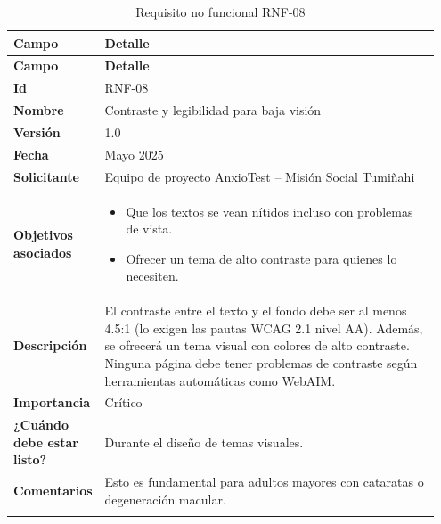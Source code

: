 \begin{longtable}{p{0.15\linewidth} p{0.80\linewidth}}
\toprule
\rowcolor{tableheader!20}
\textbf{Campo} & \textbf{Detalle} \\
\midrule
\endfirsthead
\rowcolor{tableheader!20}
\textbf{Campo} & \textbf{Detalle} \\
\midrule
\endhead
\bottomrule
\endfoot
\textbf{Id} & RNF-08 \\
\textbf{Nombre} & Contraste y legibilidad para baja visión \\
\textbf{Versión} & 1.0 \\
\textbf{Fecha} & Mayo 2025 \\
\textbf{Solicitante} & Equipo de proyecto AnxioTest – Misión Social Tumiñahi \\
\textbf{Objetivos asociados} & 
  \begin{itemize}
    \item Que los textos se vean nítidos incluso con problemas de vista.
    \item Ofrecer un tema de alto contraste para quienes lo necesiten.
  \end{itemize} \\
\textbf{Descripción} & El contraste entre el texto y el fondo debe ser al menos 4.5:1 (lo exigen las pautas WCAG 2.1 nivel AA). Además, se ofrecerá un tema visual con colores de alto contraste. Ninguna página debe tener problemas de contraste según herramientas automáticas como WebAIM. \\
\textbf{Importancia} & Crítico \\
\textbf{¿Cuándo debe estar listo?} & Durante el diseño de temas visuales. \\
\textbf{Comentarios} & Esto es fundamental para adultos mayores con cataratas o degeneración macular. \\
\bottomrule
\caption{Requisito no funcional RNF-08}
\end{longtable}

